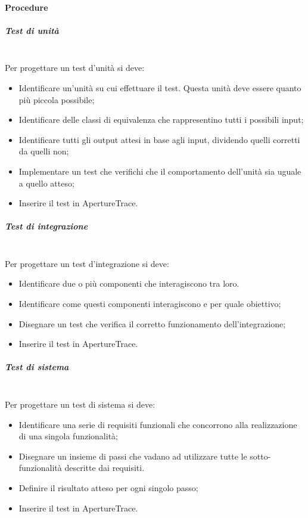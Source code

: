 \paragraph{Procedure}

\subparagraph{Test di unità} \hfill \\
Per progettare un test d'unità si deve:
\begin{itemize}
\item Identificare un'unità su cui effettuare il test. Questa unità deve essere quanto più piccola possibile;
\item Identificare delle classi di equivalenza che rappresentino tutti i possibili input;
\item Identificare tutti gli output attesi in base agli input, dividendo quelli corretti da quelli non;
\item Implementare un test che verifichi che il comportamento dell'unità sia uguale a quello atteso;
\item Inserire il test in ApertureTrace.
\end{itemize}

\subparagraph{Test di integrazione} \hfill \\
Per progettare un test d'integrazione si deve:
\begin{itemize}
\item Identificare due o più componenti che interagiscono tra loro.
\item Identificare come questi componenti interagiscono e per quale obiettivo;
\item Disegnare un test che verifica il corretto funzionamento dell'integrazione;
\item Inserire il test in ApertureTrace.
\end{itemize}

\subparagraph{Test di sistema} \hfill \\
Per progettare un test di sistema si deve:
\begin{itemize}
\item Identificare una serie di requisiti funzionali che concorrono alla realizzazione di una singola funzionalità;
\item Disegnare un insieme di passi che vadano ad utilizzare tutte le sotto-funzionalità descritte dai requisiti.
\item Definire il risultato atteso per ogni singolo passo;
\item Inserire il test in ApertureTrace.
\end{itemize}

